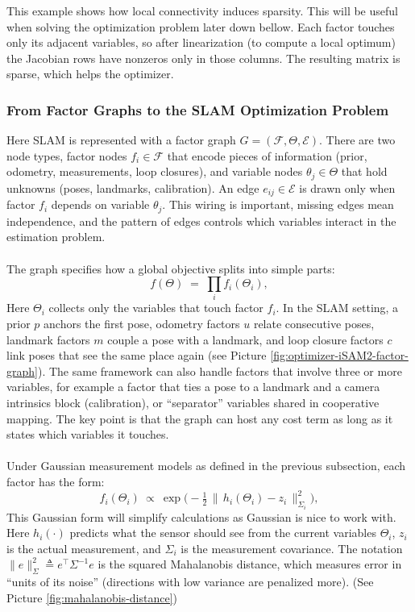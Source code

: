 \noindent
This example shows how local connectivity induces sparsity. This will be useful when solving the optimization problem later down bellow. Each factor touches only its adjacent variables, so after linearization (to compute a local optimum) the Jacobian rows have nonzeros only in those columns. The resulting matrix is sparse, which helps the optimizer.



\subsubsection{From Factor Graphs to the SLAM Optimization Problem}
Here SLAM is represented with a factor graph $G=(\mathcal{F},\Theta,\mathcal{E})$. There are two node types, factor nodes $f_i\in\mathcal{F}$ that encode pieces of information (prior, odometry, measurements, loop closures), and variable nodes $\theta_j\in\Theta$ that hold unknowns (poses, landmarks, calibration). An edge $e_{ij}\in\mathcal{E}$ is drawn only when factor $f_i$ depends on variable $\theta_j$. This wiring is important, missing edges mean independence, and the pattern of edges controls which variables interact in the estimation problem.
\\ \\
The graph specifies how a global objective splits into simple parts:
\[
    f(\Theta)\;=\;\prod_i f_i(\Theta_i),
\]
Here $\Theta_i$ collects only the variables that touch factor $f_i$. In the SLAM setting, a prior $p$ anchors the first pose, odometry factors $u$ relate consecutive poses, landmark factors $m$ couple a pose with a landmark, and loop closure factors $c$ link poses that see the same place again (see Picture \ref{fig:optimizer-iSAM2-factor-graph}). The same framework can also handle factors that involve three or more variables, for example a factor that ties a pose to a landmark and a camera intrinsics block (calibration), or ``separator'' variables shared in cooperative mapping. The key point is that the graph can host any cost term as long as it states which variables it touches.
\\ \\
Under Gaussian measurement models as defined in the previous subsection, each factor has the form:
\[
    f_i(\Theta_i)\ \propto\ \exp\!\Big(-\tfrac12\,\|\,h_i(\Theta_i)-z_i\,\|^2_{\Sigma_i}\Big),
\]
This Gaussian form will simplify calculations as Gaussian is nice to work with. Here $h_i(\cdot)$ predicts what the sensor should see from the current variables $\Theta_i$, $z_i$ is the actual measurement, and $\Sigma_i$ is the measurement covariance. The notation $\|e\|^2_{\Sigma}\triangleq e^\top \Sigma^{-1} e$ is the squared Mahalanobis distance, which measures error in ``units of its noise'' (directions with low variance are penalized more). (See Picture \ref{fig:mahalanobis-distance})
